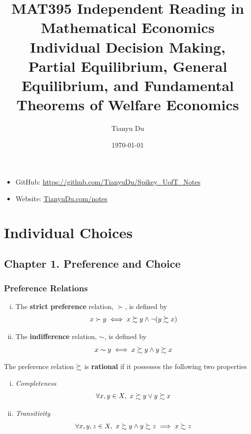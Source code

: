 \documentclass{report}
\title{MAT395 Independent Reading in Mathematical Economics\\ \small Individual Decision Making, Partial Equilibrium, General Equilibrium, and Fundamental Theorems of Welfare Economics}
\date{\today}
\author{Tianyu Du}
\begin{document}
	\maketitle
	\doclicenseThis
	\begin{itemize}
		\item GitHub: \url{https://github.com/TianyuDu/Spikey_UofT_Notes}
		\item Website: \url{TianyuDu.com/notes}
	\end{itemize}
	\tableofcontents
	
	\chapter{Individual Choices}
	\section{Chapter 1. Preference and Choice}
	\subsection{Preference Relations}
	
		\begin{definition} \quad
			\begin{enumerate}[(i)]
				\item The \textbf{strict preference} relation, $\succ$, is defined by
					\begin{equation}
						x \succ y \iff x \succsim y \land \neg (y \succsim x)
					\end{equation}
				\item The \textbf{indifference} relation, $\sim$, is defined by
					\begin{equation}
						x \sim y \iff x \succsim y \land y \succsim x
					\end{equation}
			\end{enumerate}
		\end{definition}
	
		\begin{definition}[1.B.1]
			The preference relation $\succsim$ is \textbf{rational} if it possesses the following two properties
			\begin{enumerate}[(i)]
				\item \emph{Completeness} 
					\begin{equation}
						\forall x, y \in X,\ x \succsim y \lor y \succsim x
					\end{equation}
				\item \emph{Transitivity}
					\begin{equation}
						\forall x, y, z \in X,\ x \succsim y \land y \succsim z \implies x \succsim z
					\end{equation}
			\end{enumerate}
		\end{definition}
	
\end{document}
